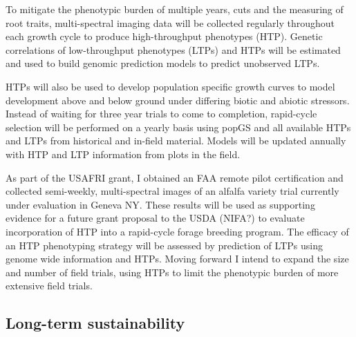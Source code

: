 \documentclass[11pt]{article}
\begin{document}
To mitigate the phenotypic burden of multiple years, cuts and the measuring of root traits, multi-spectral imaging data will be collected regularly throughout each growth cycle to produce high-throughput phenotypes (HTP). Genetic correlations of low-throughput phenotypes (LTPs) and HTPs will be estimated and used to build genomic prediction models to predict unobserved LTPs. 


HTPs will also be used to develop population specific growth curves to model development above and below ground under differing biotic and abiotic stressors. Instead of waiting for three year trials to come to completion, rapid-cycle selection will be performed on a yearly basis using popGS and all available HTPs and LTPs from historical and in-field material. Models will be updated annually with HTP and LTP information from plots in the field. 

As part of the USAFRI grant, I obtained an FAA remote pilot certification and collected semi-weekly, multi-spectral images of an alfalfa variety trial currently under evaluation in Geneva NY. These results will be used as supporting evidence for a future grant proposal to the USDA (NIFA?) to evaluate incorporation of HTP into a rapid-cycle forage breeding program. The efficacy of an HTP phenotyping strategy will be assessed by prediction of LTPs using genome wide information and HTPs. Moving forward I intend to expand the size and number of field trials, using HTPs to limit the phenotypic burden of more extensive field trials. 


\subsection*{Long-term sustainability}
\end{document}
